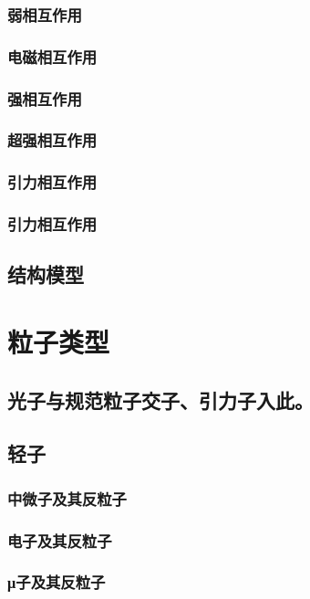 \documentclass[UTF8]{../06-Physics}
\begin{document}
        \subsubsection{弱相互作用}
        \subsubsection{电磁相互作用}
        \subsubsection{强相互作用}
        \subsubsection{超强相互作用}
        \subsubsection{引力相互作用}
        \subsubsection{引力相互作用}
    \subsection{结构模型}



\section{粒子类型}

    \subsection{光子与规范粒子交子、引力子入此。}
    \subsection{轻子}
        \subsubsection{中微子及其反粒子}
        \subsubsection{电子及其反粒子}
        \subsubsection{μ子及其反粒子}
\end{document}
